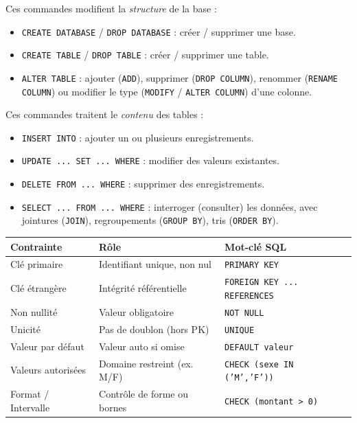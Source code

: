 \documentclass[11pt]{article}
\begin{document}
\begin{propriete}
Ces commandes modifient la \emph{structure} de la base :
\begin{itemize}
\item \texttt{CREATE DATABASE} / \texttt{DROP DATABASE} : créer / supprimer une base.
\item \texttt{CREATE TABLE} / \texttt{DROP TABLE} : créer / supprimer une table.
\item \texttt{ALTER TABLE} : ajouter (\texttt{ADD}), supprimer (\texttt{DROP COLUMN}), renommer (\texttt{RENAME COLUMN}) ou modifier le type (\texttt{MODIFY} / \texttt{ALTER COLUMN}) d'une colonne.
\end{itemize}
\end{propriete}

\begin{propriete}
Ces commandes traitent le \emph{contenu} des tables :
\begin{itemize}
\item \texttt{INSERT INTO} : ajouter un ou plusieurs enregistrements.
\item \texttt{UPDATE ... SET ... WHERE} : modifier des valeurs existantes.
\item \texttt{DELETE FROM ... WHERE} : supprimer des enregistrements.
\item \texttt{SELECT ... FROM ... WHERE} : interroger (consulter) les données, avec jointures (\texttt{JOIN}), regroupements (\texttt{GROUP BY}), tris (\texttt{ORDER BY}).
\end{itemize}
\end{propriete}

\begin{propriete}
\begin{center}
\begin{tabularx}{\linewidth}{|l|X|l|}
\hline
\rowcolor{popblueL} \textbf{Contrainte} & \textbf{Rôle} & \textbf{Mot-clé SQL} \\
\hline
Clé primaire & Identifiant unique, non nul & \texttt{PRIMARY KEY} \\
\hline
Clé étrangère & Intégrité référentielle & \texttt{FOREIGN KEY ... REFERENCES} \\
\hline
Non nullité & Valeur obligatoire & \texttt{NOT NULL} \\
\hline
Unicité & Pas de doublon (hors PK) & \texttt{UNIQUE} \\
\hline
Valeur par défaut & Valeur auto si omise & \texttt{DEFAULT valeur} \\
\hline
Valeurs autorisées & Domaine restreint (ex. M/F) & \texttt{CHECK (sexe IN ('M','F'))} \\
\hline
Format / Intervalle & Contrôle de forme ou bornes & \texttt{CHECK (montant > 0)} \\
\hline
\end{tabularx}
\end{center}
\end{propriete}
\end{document}
